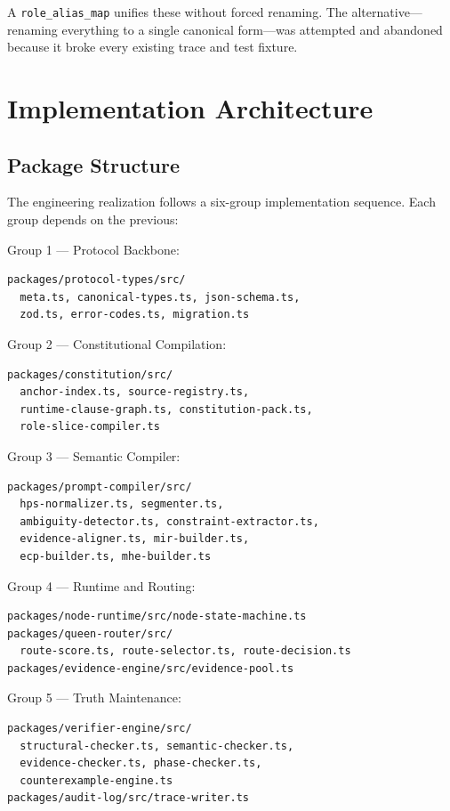 \documentclass[12pt,a4paper]{article}
\begin{document}
A \texttt{role\_alias\_map} unifies these without forced renaming. The alternative---renaming everything to a single canonical form---was attempted and abandoned because it broke every existing trace and test fixture.

\section{Implementation Architecture}


\subsection{Package Structure}


The engineering realization follows a six-group implementation sequence. Each group depends on the previous:

Group 1 --- Protocol Backbone:
\begin{verbatim}
packages/protocol-types/src/
  meta.ts, canonical-types.ts, json-schema.ts,
  zod.ts, error-codes.ts, migration.ts
\end{verbatim}


Group 2 --- Constitutional Compilation:
\begin{verbatim}
packages/constitution/src/
  anchor-index.ts, source-registry.ts,
  runtime-clause-graph.ts, constitution-pack.ts,
  role-slice-compiler.ts
\end{verbatim}


Group 3 --- Semantic Compiler:
\begin{verbatim}
packages/prompt-compiler/src/
  hps-normalizer.ts, segmenter.ts,
  ambiguity-detector.ts, constraint-extractor.ts,
  evidence-aligner.ts, mir-builder.ts,
  ecp-builder.ts, mhe-builder.ts
\end{verbatim}


Group 4 --- Runtime and Routing:
\begin{verbatim}
packages/node-runtime/src/node-state-machine.ts
packages/queen-router/src/
  route-score.ts, route-selector.ts, route-decision.ts
packages/evidence-engine/src/evidence-pool.ts
\end{verbatim}


Group 5 --- Truth Maintenance:
\begin{verbatim}
packages/verifier-engine/src/
  structural-checker.ts, semantic-checker.ts,
  evidence-checker.ts, phase-checker.ts,
  counterexample-engine.ts
packages/audit-log/src/trace-writer.ts
\end{verbatim}
\end{document}
